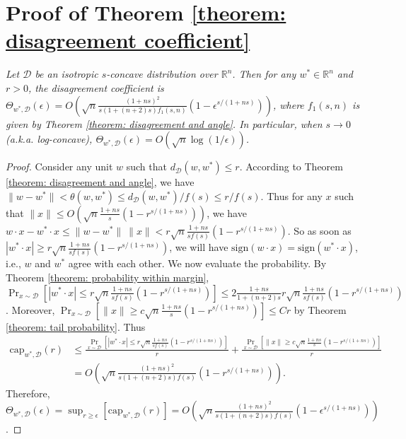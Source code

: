 \documentclass[11pt]{article}
\newcommand{\R}{\mathbb{R}}
\begin{document}
{{{{\section{Proof of Theorem \ref{theorem: disagreement coefficient}}

\emph{Let $\mathcal{D}$ be an isotropic $s$-concave distribution over $\R^n$. Then for any $w^*\in\R^n$ and $r>0$, the disagreement coefficient is $\Theta_{w^*,\mathcal{D}}(\epsilon)=O\left(\sqrt{n}\frac{(1+ns)^2}{s(1+(n+2)s)f_1(s,n)}(1-\epsilon^{s/(1+ns)})\right)$, where $f_1(s,n)$ is given by Theorem \ref{theorem: disagreement and angle}. In particular, when $s\rightarrow0$ (a.k.a. log-concave), $\Theta_{w^*,\mathcal{D}}(\epsilon)=O(\sqrt{n}\log(1/\epsilon))$.}
\medskip
\begin{proof}
Consider any unit $w$ such that $d_{\mathcal{D}}(w,w^*)\le r$. According to Theorem \ref{theorem: disagreement and angle}, we have $\|w-w^*\|<\theta(w,w^*)\le d_{\mathcal{D}}(w,w^*)/f(s)\le r/f(s)$. Thus for any $x$ such that $\|x\|\le O(\sqrt{n}\frac{1+ns}{s}(1-r^{s/(1+ns)}))$, we have
$
w\cdot x-w^*\cdot x\le \|w-w^*\|\ \|x\|<r\sqrt{n}\frac{1+ns}{sf(s)}(1-r^{s/(1+ns)})$.
So as soon as $|w^*\cdot x|\ge r\sqrt{n}\frac{1+ns}{sf(s)}(1-r^{s/(1+ns)})$, we will have $\text{sign}(w\cdot x)=\text{sign}(w^*\cdot x)$, i.e., $w$ and $w^*$ agree with each other. We now evaluate the probability. By Theorem \ref{theorem: probability within margin},
$\Pr_{x\sim\mathcal{D}}\left[|w^*\cdot x|\le r\sqrt{n}\frac{1+ns}{sf(s)}(1-r^{s/(1+ns)})\right]\le 2\frac{1+ns}{1+(n+2)s}r\sqrt{n}\frac{1+ns}{sf(s)}(1-r^{s/(1+ns)})$.
Moreover, $\Pr_{x\sim\mathcal{D}}\left[\|x\|\ge c\sqrt{n}\frac{1+ns}{s}(1-r^{s/(1+ns)})\right]\le Cr$ by Theorem \ref{theorem: tail probability}.
Thus
\begin{equation*}
\begin{split}
\text{cap}_{w^*,\mathcal{D}}(r)&\le \frac{\Pr_{x\sim\mathcal{D}}\left[|w^*\cdot x|\le r\sqrt{n}\frac{1+ns}{sf(s)}(1-r^{s/(1+ns)})\right]}{r}+\frac{\Pr_{x\sim\mathcal{D}}\left[\|x\|\ge c\sqrt{n}\frac{1+ns}{s}(1-r^{s/(1+ns)})\right]}{r}\\
&=O\left(\sqrt{n}\frac{(1+ns)^2}{s(1+(n+2)s)f(s)}(1-r^{s/(1+ns)})\right).
\end{split}
\end{equation*}
Therefore,
$\Theta_{w^*,\mathcal{D}}(\epsilon)=\sup_{r\ge\epsilon}[\text{cap}_{w^*,\mathcal{D}}(r)]=O\left(\sqrt{n}\frac{(1+ns)^2}{s(1+(n+2)s)f(s)}(1-\epsilon^{s/(1+ns)})\right)$.
\end{proof}




}}}}
\end{document}
